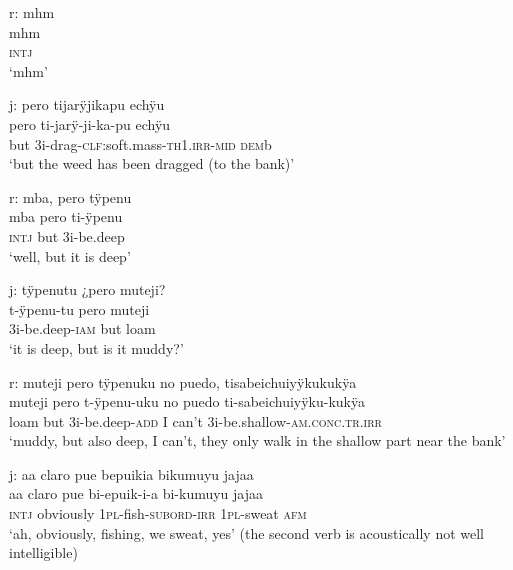 \ea%
\begingl 
\glpreamble \textup{r:} mhm\\
\gla mhm\\ 
\glb \textsc{intj}\\ 
\glft ‘mhm’\\ 
\endgl
\xe

\ea%
\begingl 
\glpreamble \textup{j:} pero tijarÿjikapu echÿu\\
\gla pero ti-jarÿ-ji-ka-pu echÿu\\ 
\glb but 3i-drag-\textsc{clf:}soft.mass-\textsc{th}1\textsc{.irr}-\textsc{mid} \textsc{dem}b\\ 
\glft ‘but the weed has been dragged (to the bank)’\\ 
\endgl
\xe

\ea%
\begingl 
\glpreamble \textup{r:} mba, pero tÿpenu\\
\gla mba pero ti-ÿpenu\\ 
\glb \textsc{intj} but 3i-be.deep\\ 
\glft ‘well, but it is deep’\\ 
\endgl
\xe

\ea%
\begingl 
\glpreamble \textup{j:} tÿpenutu ¿pero muteji?\\
\gla t-ÿpenu-tu pero muteji\\ 
\glb 3i-be.deep-\textsc{iam} but loam\\ 
\glft ‘it is deep, but is it muddy?’\\ 
\endgl
\xe

\ea%
\begingl 
\glpreamble \textup{r:} muteji pero tÿpenuku no puedo, tisabeichuiyÿkukukÿa\\
\gla muteji pero t-ÿpenu-uku {no puedo} ti-sabeichuiyÿku-kukÿa\\ 
\glb loam but 3i-be.deep-\textsc{add} {I can’t} 3i-be.shallow-\textsc{am.conc.tr}.\textsc{irr}\\ 
\glft ‘muddy, but also deep, I can’t, they only walk in the shallow part near the bank’\\ 
\endgl
\xe



\ea%
\begingl 
\glpreamble \textup{j:} aa claro pue bepuikia bikumuyu jajaa\\
\gla aa {claro pue} bi-epuik-i-a bi-kumuyu  jajaa\\ 
\glb \textsc{intj} {obviously}  1\textsc{pl}-fish-\textsc{subord}-\textsc{irr} 1\textsc{pl}-sweat \textsc{afm}\\ 
\glft ‘ah, obviously, fishing, we sweat, yes’ (the second verb is acoustically not well intelligible)\\ 
\endgl
\xe


